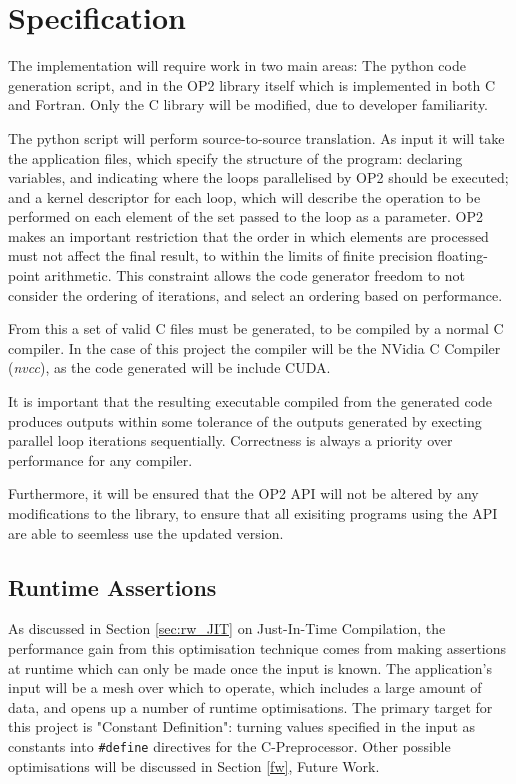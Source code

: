 
\section{Specification}
The implementation will require work in two main areas: The python code generation script, and in the OP2 library itself which is implemented in both C and Fortran. Only the C library will be modified, due to developer familiarity.
\par
The python script will perform source-to-source translation. As input it will take the application files, which specify the structure of the program: declaring variables, and indicating where the loops parallelised by OP2 should be executed; and a kernel descriptor for each loop, which will describe the operation to be performed on each element of the set passed to the loop as a parameter. OP2 makes an important restriction that the order in which elements are processed must not affect the final result, to within the limits of finite precision floating-point arithmetic\cite[p3]{op2main}. This constraint allows the code generator freedom to not consider the ordering of iterations, and select an ordering based on performance.
\par
From this a set of valid C files must be generated, to be compiled by a normal C compiler. In the case of this project the compiler will be the NVidia C Compiler (\textit{nvcc}), as the code generated will be include CUDA.
\par
It is important that the resulting executable compiled from the generated code produces outputs within some tolerance of the outputs generated by execting parallel loop iterations sequentially. Correctness is always a priority over performance for any compiler.
\par
Furthermore, it will be ensured that the OP2 API will not be altered by any modifications to the library, to ensure that all exisiting programs using the API are able to seemless use the updated version.

\subsection{Runtime Assertions}
As discussed in Section \ref{sec:rw_JIT} on Just-In-Time Compilation, the performance gain from this optimisation technique comes from making assertions at runtime which can only be made once the input is known. The application's input will be a mesh over which to operate, which includes a large amount of data, and opens up a number of runtime optimisations. The primary target for this project is "Constant Definition": turning values specified in the input as constants into \verb|#define| directives for the C-Preprocessor. Other possible optimisations will be discussed in Section \ref{fw}, Future Work.\\

